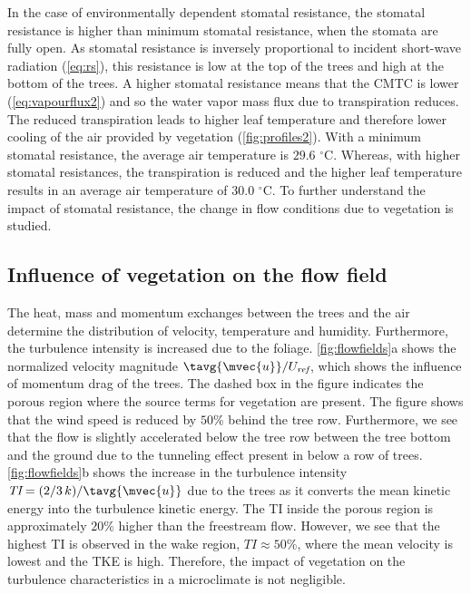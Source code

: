 In the case of environmentally dependent stomatal resistance, the stomatal resistance is higher than minimum stomatal resistance, when the stomata are fully open. As stomatal resistance is inversely proportional to incident short-wave radiation (\cref{eq:rs}), this resistance is low at the top of the trees and high at the bottom of the trees. A higher stomatal resistance means that the CMTC is lower (\cref{eq:vapourflux2}) and so the water vapor mass flux due to transpiration reduces. The reduced transpiration leads to higher leaf temperature and therefore lower cooling of the air provided by vegetation (\cref{fig:profiles2}). With a minimum stomatal resistance, the average air temperature is $29.6$ $^{\circ}$C. Whereas, with higher stomatal resistances, the transpiration is reduced and the higher leaf temperature results in an average air temperature of $30.0$ $^{\circ}$C. To further understand the impact of stomatal resistance, the change in flow conditions due to vegetation is studied.

\subsection{Influence of vegetation on the flow field}

The heat, mass and momentum exchanges between the trees and the air determine the distribution of velocity, temperature and humidity. Furthermore, the turbulence intensity is increased due to the foliage. \cref{fig:flowfields}a shows the normalized velocity magnitude $\tavg{\mvec{u}}/U_{\textit{ref}}$, which shows the influence of momentum drag of the trees. The dashed box in the figure indicates the porous region where the source terms for vegetation are present. The figure shows that the wind speed is reduced by $50$\% behind the tree row. Furthermore, we see that the flow is slightly accelerated below the tree row between the tree bottom and the ground due to the tunneling effect present in below a row of trees. \cref{fig:flowfields}b shows the increase in the turbulence intensity $\textit{TI}=(2/3\,k)/\tavg{\mvec{u}}$ due to the trees as it converts the mean kinetic energy into the turbulence kinetic energy. The TI inside the porous region is approximately $20$\% higher than the freestream flow. However, we see that the highest TI is observed in the wake region, $TI\approx50$\%, where the mean velocity is lowest and the TKE is high. Therefore, the impact of vegetation on the turbulence characteristics in a microclimate is not negligible. 

